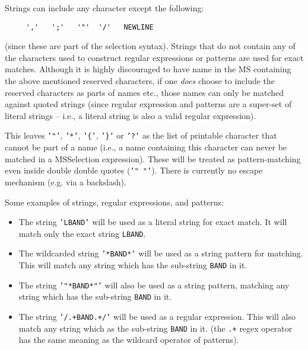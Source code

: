 Strings can include any character except the following:
\small
\begin{verbatim}
     ','   ';'   '"'  '/'   NEWLINE
\end{verbatim}
\normalsize
(since these are part of the selection syntax).  
Strings that do not contain any of the characters used to construct
regular expressions or patterns are used for exact matches. Although
it is highly discouraged to have name in the MS containing the above
mentioned reserved characters, if one {\it does} choose to include the
reserved characters as parts of names etc., those names can only be
matched against quoted strings (since regular expression and patterns
are a super-set of literal strings -- i.e., a literal string is also a valid
regular expression). 

This leaves  
{\tt '"'}, {\tt '*'}, {\tt'\{'}, {\tt '\}'} or {\tt '?'}
as the list of printable character that cannot be part of a name
(i.e., a name containing this character can never be matched in a
MSSelection expression).  These will be treated as pattern-matching
even inside double double quotes ({\tt '" "'}).
There is currently no escape mechanism (e.g. via a backslash).

Some examples of strings, regular expressions, and patterns:
\begin{itemize}

\item The string {\tt 'LBAND'} will be used as a literal string for
      exact match.  It will match only the exact string {\tt LBAND}.

\item The wildcarded string {\tt '*BAND*'} will be used as a string pattern 
      for matching. This will match any string which has the
      sub-string {\tt BAND} in it. 

\item The string {\tt '"*BAND*"'} will also be used as a string
      pattern, matching any string which has the sub-string {\tt BAND} in it. 

\item The string {\tt '/.+BAND.+/'} will be used as a regular
      expression. This will also match any string which as the 
      sub-string {\tt BAND} in it. (the {\tt .+} regex operator 
      has the same meaning as the {\tt *} wildcard operator of patterns). 

\end{itemize}

